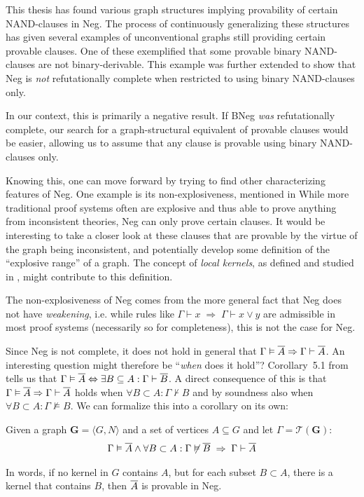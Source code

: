 This thesis has found various graph structures implying provability of certain NAND-clauses in Neg.
The process of continuously generalizing these structures has given several examples of unconventional graphs still providing certain provable clauses.
One of these exemplified that some provable binary NAND-clauses are not binary-derivable.
This example was further extended to show that Neg is \textit{not} refutationally complete when restricted to using binary NAND-clauses only.

In our context, this is primarily a negative result.
If BNeg \textit{was} refutationally complete, our search for a graph-structural equivalent of provable clauses would be easier, allowing us to assume that any clause is provable using binary NAND-clauses only.

Knowing this, one can move forward by trying to find other characterizing features of Neg.
One example is its non-explosiveness, mentioned in \cite{michal-completeness}
While more traditional proof systems often are explosive and thus able to prove anything from inconsistent theories, Neg can only prove certain clauses.
It would be interesting to take a closer look at these clauses that are provable by the virtue of the graph being inconsistent, and potentially develop some definition of the ``explosive range'' of a graph.
The concept of \textit{local kernels}, as defined and studied in \cite{synthese-pdl}, might contribute to this definition.

The non-explosiveness of Neg comes from the more general fact that Neg does not have \textit{weakening}, i.e. while rules like $\Gamma \vdash x \; \Rightarrow \; \Gamma \vdash x \vee y$ are admissible in most proof systems (necessarily so for completeness), this is not the case for Neg.

Since Neg is not complete, it does not hold in general that $\Gamma \vDash \ol{A} \Rightarrow \Gamma \vdash \ol{A}$.
An interesting question might therefore be ``\textit{when} does it hold''?
Corollary~5.1 from \cite{michal-completeness} tells us that $\Gamma \vDash \ol{A} \Leftrightarrow \exists B \subseteq A: \Gamma \vdash \ol{B}$.
A direct consequence of this is that $\Gamma \vDash \ol{A} \Rightarrow \Gamma \vdash \ol{A}$ holds when $\forall B \subset A: \Gamma \not\vdash B$ and by soundness also when $\forall B \subset A: \Gamma \not\vDash B$.
We can formalize this into a corollary on its own:
\begin{corollary}
  Given a graph $\mathbf{G} = \langle G,N \rangle$ and a set of vertices $A \subseteq G$ and let $\Gamma = \mathcal{T}(\mathbf{G})$:
  \begin{align}
    \Gamma \vDash \ol{A} \wedge \forall B \subset A: \Gamma \not\vDash \ol{ B } \;\Rightarrow \; \Gamma \vdash \ol{A}
  \end{align}
\end{corollary}
In words, if no kernel in $G$ contains $A$, but for each subset $B \subset A$, there is a kernel that contains $B$, then $\ol{A}$ is provable in Neg.

